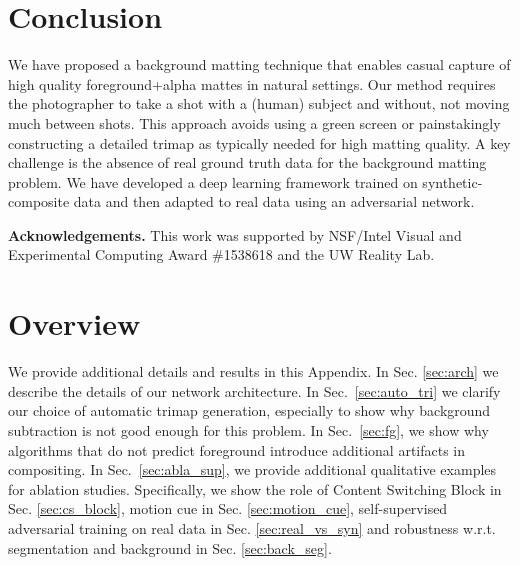 \documentclass[10pt,twocolumn,letterpaper]{article}
\newif\ifarxiv
\begin{document}
 \section{Conclusion}
\vspace{-0.5em}
\label{sec:discussion}
We have proposed a  background matting technique that enables casual capture of high quality foreground+alpha mattes in natural settings.  Our method  requires the photographer to take a shot with a (human) subject and without, not moving much between shots.  This approach avoids using a green screen or painstakingly constructing a detailed trimap as typically needed for high matting quality. A key challenge is the absence of real ground truth data for the background matting problem. We have developed a deep learning framework trained on synthetic-composite data and then adapted to real data using an adversarial network. 

\textbf{Acknowledgements.} This work was supported by NSF/Intel Visual and Experimental Computing Award \#1538618 and the UW Reality Lab.







\clearpage
\newpage








 
\newpage
{\small


}



\ifarxiv
    \newpage
    \clearpage
    \appendix
    \section{Overview}
We provide additional details and results in this Appendix. In Sec. \ref{sec:arch} we describe the details of our network architecture. In Sec.~\ref{sec:auto_tri} we clarify our choice of automatic trimap generation, especially to show why background subtraction is not good enough for this problem.  In Sec.~\ref{sec:fg}, we show why algorithms that do not predict foreground  introduce additional artifacts in compositing. In Sec.~\ref{sec:abla_sup}, we provide additional qualitative examples for ablation studies. Specifically, we show the role of Content Switching Block in Sec. \ref{sec:cs_block}, motion cue in Sec. \ref{sec:motion_cue},  self-supervised adversarial training on real data in Sec. \ref{sec:real_vs_syn} and robustness w.r.t. segmentation and background in Sec. \ref{sec:back_seg}.
\end{document}
